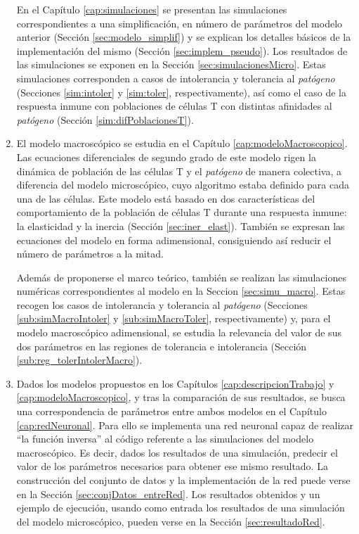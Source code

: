\begin{enumerate}
	En el Capítulo \ref{cap:simulaciones} se presentan las simulaciones correspondientes a una simplificación, en número de parámetros del modelo anterior (Sección \ref{sec:modelo_simplif}) y se explican los detalles básicos de la implementación del mismo (Sección \ref{sec:implem_pseudo}). Los resultados de las simulaciones se exponen en la Sección \ref{sec:simulacionesMicro}. Estas simulaciones corresponden a casos de intolerancia y tolerancia al \textit{patógeno} (Secciones \ref{sim:intoler} y \ref{sim:toler}, respectivamente), así como el caso de la respuesta inmune con poblaciones de células T con distintas afinidades al \textit{patógeno} (Sección \ref{sim:difPoblacionesT}).
	
	
	\item El modelo macroscópico se estudia en el Capítulo \ref{cap:modeloMacroscopico}. Las ecuaciones diferenciales de segundo grado de este modelo rigen la dinámica de población de las células T y el \textit{patógeno} de manera colectiva, a diferencia del modelo microscópico, cuyo algoritmo estaba definido para cada una de las células. Este modelo está basado en dos características del comportamiento de la población de células T durante una respuesta inmune: la elasticidad y la inercia (Sección \ref{sec:iner_elast}). También se expresan las ecuaciones del modelo en forma adimensional, consiguiendo así reducir el número de parámetros a la mitad.
	
	Además de proponerse el marco teórico, también se realizan las simulaciones numéricas correspondientes al modelo en la Seccion \ref{sec:simu_macro}. Estas recogen los casos de intolerancia y tolerancia al \textit{patógeno} (Secciones \ref{sub:simMacroIntoler} y \ref{sub:simMacroToler}, respectivamente) y, para el modelo macroscópico adimensional, se estudia la relevancia del valor de sus dos parámetros en las regiones de tolerancia e intolerancia (Sección \ref{sub:reg_tolerIntolerMacro}).
	
	\item Dados los modelos propuestos en los Capítulos \ref{cap:descripcionTrabajo} y \ref{cap:modeloMacroscopico}, y tras la comparación de sus resultados, se busca una correspondencia de parámetros entre ambos modelos en el Capítulo \ref{cap:redNeuronal}. Para ello se implementa una red neuronal capaz de realizar ``la función inversa'' al código referente a las simulaciones del modelo macroscópico. Es decir, dados los resultados de una simulación, predecir el valor de los parámetros necesarios para obtener ese mismo resultado. La construcción del conjunto de datos y la implementación de la red puede verse en la Sección \ref{sec:conjDatos_entreRed}. Los resultados obtenidos y un ejemplo de ejecución, usando como entrada los resultados de una simulación del modelo microscópico, pueden verse en la Sección \ref{sec:resultadoRed}.
	
\end{enumerate}

